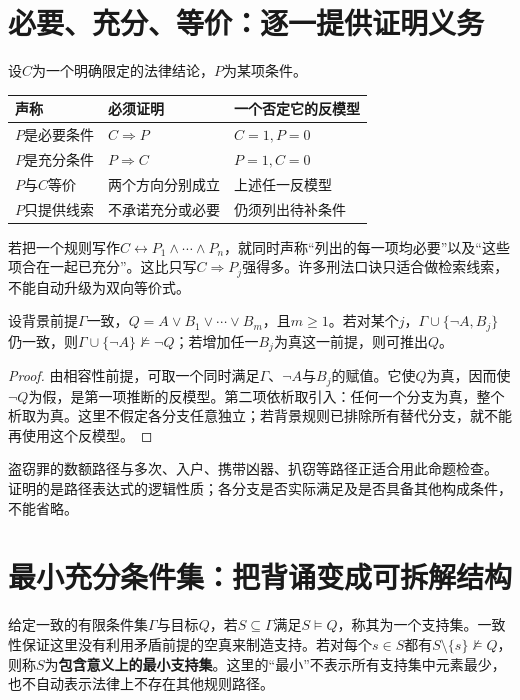 \section{必要、充分、等价：逐一提供证明义务}
设$C$为一个明确限定的法律结论，$P$为某项条件。
\begin{center}
\begin{tabular}{p{}p{}p{}}
\toprule
声称 & 必须证明 & 一个否定它的反模型\\\midrule
$P$是必要条件 & $C\Rightarrow P$ & $C=1,P=0$\\
$P$是充分条件 & $P\Rightarrow C$ & $P=1,C=0$\\
$P$与$C$等价 & 两个方向分别成立 & 上述任一反模型\\
$P$只提供线索 & 不承诺充分或必要 & 仍须列出待补条件\\\bottomrule
\end{tabular}
\end{center}

若把一个规则写作$C\leftrightarrow P_1\wedge\cdots\wedge P_n$，就同时声称“列出的每一项均必要”以及“这些项合在一起已充分”。这比只写$C\Rightarrow P_j$强得多。许多刑法口诀只适合做检索线索，不能自动升级为双向等价式。

\begin{modelprop}[否定一个析取分支不等于否定整体]
设背景前提$\Gamma$一致，$Q=A\vee B_1\vee\cdots\vee B_m$，且$m\ge1$。若对某个$j$，$\Gamma\cup\{\neg A,B_j\}$仍一致，则$\Gamma\cup\{\neg A\}\not\models\neg Q$；若增加任一$B_j$为真这一前提，则可推出$Q$。
\end{modelprop}
\begin{proof}
由相容性前提，可取一个同时满足$\Gamma$、$\neg A$与$B_j$的赋值。它使$Q$为真，因而使$\neg Q$为假，是第一项推断的反模型。第二项依析取引入：任何一个分支为真，整个析取为真。这里不假定各分支任意独立；若背景规则已排除所有替代分支，就不能再使用这个反模型。
\end{proof}

盗窃罪的数额路径与多次、入户、携带凶器、扒窃等路径正适合用此命题检查。 证明的是路径表达式的逻辑性质；各分支是否实际满足及是否具备其他构成条件，不能省略。

\section{最小充分条件集：把背诵变成可拆解结构}
给定一致的有限条件集$\Gamma$与目标$Q$，若$S\subseteq\Gamma$满足$S\models Q$，称其为一个支持集。一致性保证这里没有利用矛盾前提的空真来制造支持。若对每个$s\in S$都有$S\setminus\{s\}\not\models Q$，则称$S$为\textbf{包含意义上的最小支持集}。这里的“最小”不表示所有支持集中元素最少，也不自动表示法律上不存在其他规则路径。


